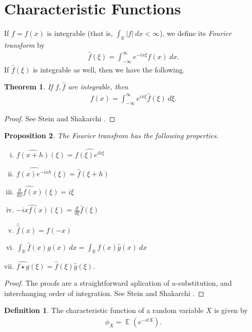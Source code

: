 \documentclass[12pt]{article}
\newcommand{\rr}{\mathbb{R}}
\newcommand{\wh}{\widehat}
\DeclareMathOperator{\ex}{\mathbb{E}}
\theoremstyle{plain}
\newtheorem{theorem}{Theorem}
\newtheorem{proposition}[theorem]{Proposition}
\theoremstyle{definition}
\newtheorem*{definition}{Definition}
\theoremstyle{remark}
\numberwithin{equation}{section}  %
\begin{document}
\section{Characteristic Functions}
If $f = f(x)$ is integrable (that is, $\int_{\rr}| f | \ dx < \infty$), we define its \emph{Fourier transform} by
\begin{equation*}
\begin{split}
	\hat{f}(\xi) = \int_{-\infty}^{\infty} e^{-i x \xi} f(x) \ dx.
\end{split}
\end{equation*}
If $ \hat{f}(\xi)$ is integrable as well, then we have the
following.
\begin{theorem}\label{thm:fourier-inversion}
	If $f, \hat{f}$ are integrable, then
	\begin{equation*}
	\begin{split}
		f(x) = \int_{-\infty}^{\infty} e^{i x \xi} \hat{f}(\xi) \ d \xi.
	\end{split}
	\end{equation*}
\end{theorem}
\begin{proof}
	See Stein and Shakarchi \cite{zbMATH02171466}.
\end{proof}
\begin{proposition}\label{prop:}
The Fourier transfrom has the following properties.
\begin{enumerate}[(i)]
	\item	$\wh{f(x+h)}(\xi) = \wh{f(\xi) e^{i h \xi}}$
	\item $\wh{f(x) e^{-i x h}}(\xi) = \wh{f}(\xi + h)$	
	\item $\wh{\frac{d}{dx} f(x)}(\xi) = i \xi$
	\item $\wh{-ix f(x)}(\xi) = \frac{d}{d \xi}\wh{f}(\xi)$
	\item $\hat{\hat{f}}(x) = f(-x)$
	\item $\int_{\rr} \wh{f}(x) g(x) \ dx = \int_{\rr} f(x) \wh{g}(x) \ dx$
	\item $\wh{f \star g}(\xi) = \wh{f}(\xi) \wh{g}(\xi)$.
\end{enumerate}
\end{proposition}
\begin{proof}
The proofs are a straightforward
aplication of $u$-substitution, and interchanging order of integration.
See Stein and Shakarchi \cite{zbMATH02171466}. 
\end{proof}
\begin{definition}
The characteristic function of a random variable $X$ is given by
\begin{equation*}
\begin{split}
	\phi_{X} = \ex(e^{-itX}).
\end{split}
\end{equation*}
\end{definition}
\end{document}

